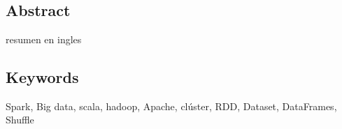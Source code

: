 \chapter*{}

\section*{Abstract}

resumen en ingles


\section*{Keywords}
Spark, Big data, scala, hadoop, Apache, clúster, RDD, Dataset, DataFrames, Shuffle